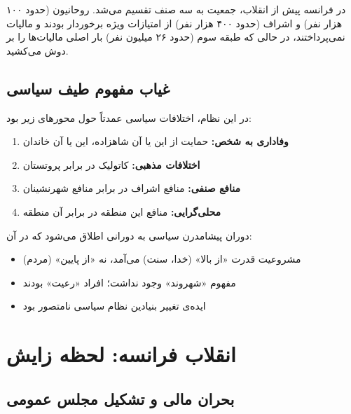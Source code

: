 \begin{historybox}
در فرانسه پیش از انقلاب، جمعیت به سه صنف تقسیم می‌شد. روحانیون (حدود ۱۰۰ هزار نفر) و اشراف (حدود ۴۰۰ هزار نفر) از امتیازات ویژه برخوردار بودند و مالیات نمی‌پرداختند، در حالی که طبقه سوم (حدود ۲۶ میلیون نفر) بار اصلی مالیات‌ها را بر دوش می‌کشید.
\end{historybox}

\subsection{غیاب مفهوم طیف سیاسی}

در این نظام، اختلافات سیاسی عمدتاً حول محورهای زیر بود:

\begin{enumerate}[nosep, rightmargin=1.5cm]
    \item \textbf{وفاداری به شخص:} حمایت از این یا آن شاهزاده، این یا آن خاندان
    \item \textbf{اختلافات مذهبی:} کاتولیک در برابر پروتستان
    \item \textbf{منافع صنفی:} منافع اشراف در برابر منافع شهرنشینان
    \item \textbf{محلی‌گرایی:} منافع این منطقه در برابر آن منطقه
\end{enumerate}

\begin{defbox}
دوران پیشامدرن سیاسی به دورانی اطلاق می‌شود که در آن:
\begin{itemize}[nosep]
    \item مشروعیت قدرت «از بالا» (خدا، سنت) می‌آمد، نه «از پایین» (مردم)
    \item مفهوم «شهروند» وجود نداشت؛ افراد «رعیت» بودند
    \item ایده‌ی تغییر بنیادین نظام سیاسی نامتصور بود
\end{itemize}
\end{defbox}

\section{انقلاب فرانسه: لحظه زایش}

\subsection{بحران مالی و تشکیل مجلس عمومی}

